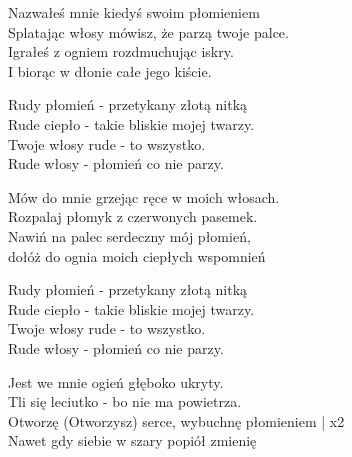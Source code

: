\begin{text}
    Nazwałeś mnie kiedyś swoim płomieniem\\
    Splatając włosy mówisz, że parzą twoje palce.\\
    Igrałeś z ogniem rozdmuchując iskry.\\
    I biorąc w dłonie całe jego kiście.

    Rudy płomień - przetykany złotą nitką\\
    Rude ciepło - takie bliskie mojej twarzy.\\
    Twoje włosy rude - to wszystko.\\
    Rude włosy - płomień co nie parzy.

    Mów do mnie grzejąc ręce w moich włosach.\\
    Rozpalaj płomyk z czerwonych pasemek.\\
    Nawiń na palec serdeczny mój płomień,\\
    dołóż do ognia moich ciepłych wspomnień

    Rudy płomień - przetykany złotą nitką\\
    Rude ciepło - takie bliskie mojej twarzy.\\
    Twoje włosy rude - to wszystko.\\
    Rude włosy - płomień co nie parzy.

    Jest we mnie ogień głęboko ukryty.\\
    Tli się leciutko - bo nie ma powietrza.\\
    Otworzę (Otworzysz) serce, wybuchnę płomieniem | x2\\
    Nawet gdy siebie w szary popiół zmienię
\end{text}
\begin{chord}

\end{chord}